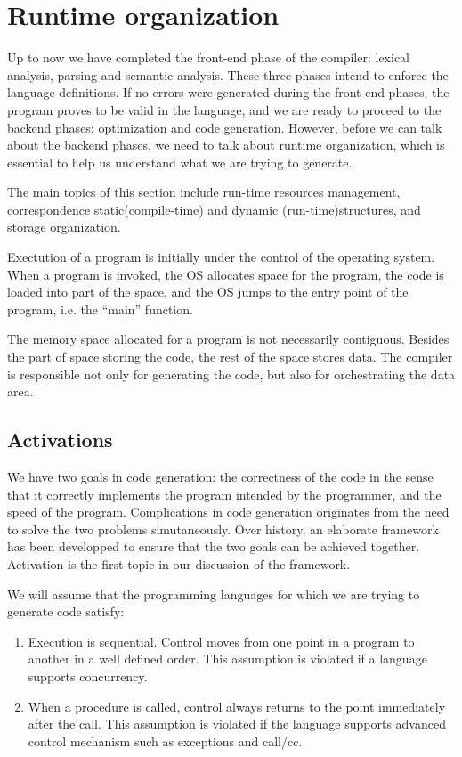 \ifx\PREAMBLE\undefined


\fi
\chapter{Runtime organization}
Up to now we have completed the front-end phase of the compiler: lexical analysis, parsing and semantic analysis. These three phases intend to enforce the language definitions. If no errors were generated during the front-end phases, the program proves to be valid in the language, and we are ready to proceed to the backend phases: optimization and code generation. However, before we can talk about the backend phases, we need to talk about runtime organization, which is essential to help us understand what we are trying to generate.

The main topics of this section include run-time resources management, correspondence static(compile-time) and dynamic (run-time)structures, and storage organization.

Exectution of a program is initially under the control of the operating system. When a program is invoked, the OS allocates space for the program, the code is loaded into part of the space, and the OS jumps to the entry point of the program, i.e. the ``main'' function. 

The memory space allocated for a program is not necessarily contiguous. Besides the part of space storing the code, the rest of the space stores data. The compiler is responsible not only for generating the code, but also for orchestrating the data area.
\section{Activations} 
We have two goals in code generation: the correctness of the code in the sense that it correctly implements the program intended by the programmer, and the speed of the program. Complications in code generation originates from the need to solve the two problems simutaneously. Over history, an elaborate framework has been developped to ensure that the two goals can be achieved together. Activation is the first topic in our discussion of the framework.

We will assume that the programming languages for which we are trying to generate code satisfy:
\begin{enumerate}
\item Execution is sequential. Control moves from one point in a program to another in a well defined order. This assumption is violated if a language supports concurrency. 
\item When a procedure is called, control always returns to the point immediately after the call. This assumption is violated if the language supports advanced control mechanism such as exceptions and call/cc.
\end{enumerate} 


